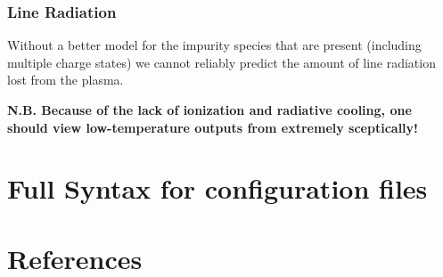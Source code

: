 \documentclass{revtex4}
\begin{document}
\subsubsection{Line Radiation}
 Without a better model for the impurity 
species that are present (including multiple charge states) we cannot reliably predict the amount of line radiation lost from the plasma.

\textbf{N.B. Because of the lack of ionization and radiative cooling, one should view low-temperature outputs from \mctrans{} extremely sceptically!}


\appendix
\section{Full Syntax for \mctrans{} configuration files}
\section{References}


\end{document}
